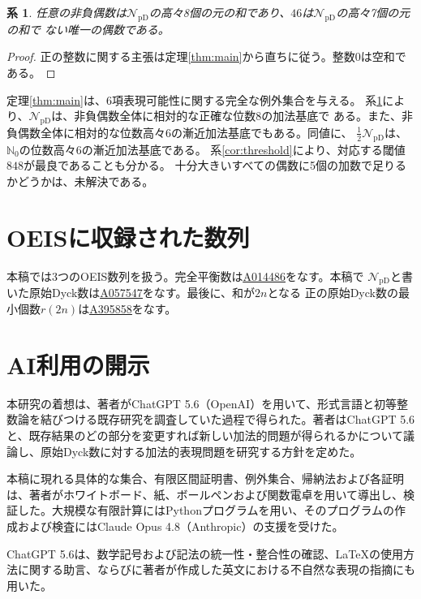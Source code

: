 \documentclass[12pt]{ltjsarticle}
\theoremstyle{plain}
\newtheorem{corollary}[theorem]{系}
\newcommand{\NpD}{\mathcal{N}_{\mathrm{pD}}}
\newcommand{\seqnum}[1]{\href{https://oeis.org/#1}{\textnormal{\underline{#1}}}}
\begin{document}
\begin{corollary}\label{cor:eight}
任意の非負偶数は$\NpD$の高々8個の元の和であり、$46$は$\NpD$の高々7個の元の和で
ない唯一の偶数である。
\end{corollary}

\begin{proof}
正の整数に関する主張は定理\ref{thm:main}から直ちに従う。整数$0$は空和である。
\end{proof}

定理\ref{thm:main}は、6項表現可能性に関する完全な例外集合を与える。
系\ref{cor:eight}により、$\NpD$は、非負偶数全体に相対的な正確な位数8の加法基底で
ある。また、非負偶数全体に相対的な位数高々6の漸近加法基底でもある。同値に、
$\frac12\NpD$は、$\mathbb N_0$の位数高々6の漸近加法基底である。
系\ref{cor:threshold}により、対応する閾値$848$が最良であることも分かる。
十分大きいすべての偶数に5個の加数で足りるかどうかは、未解決である。

\section{OEISに収録された数列}\label{sec:oeis}

本稿では3つのOEIS数列を扱う。完全平衡数は\seqnum{A014486}をなす。本稿で
$\NpD$と書いた原始Dyck数は\seqnum{A057547}をなす。最後に、和が$2n$となる
正の原始Dyck数の最小個数$r(2n)$は\seqnum{A395858}をなす。

\section{AI利用の開示}\label{sec:AI}

本研究の着想は、著者がChatGPT 5.6（OpenAI）を用いて、形式言語と初等整数論を結びつける既存研究を調査していた過程で得られた。著者はChatGPT 5.6と、既存結果のどの部分を変更すれば新しい加法的問題が得られるかについて議論し、原始Dyck数に対する加法的表現問題を研究する方針を定めた。

本稿に現れる具体的な集合、有限区間証明書、例外集合、帰納法および各証明は、著者がホワイトボード、紙、ボールペンおよび関数電卓を用いて導出し、検証した。大規模な有限計算にはPythonプログラムを用い、そのプログラムの作成および検査にはClaude Opus 4.8（Anthropic）の支援を受けた。

ChatGPT 5.6は、数学記号および記法の統一性・整合性の確認、\LaTeX{}の使用方法に関する助言、ならびに著者が作成した英文における不自然な表現の指摘にも用いた。
\end{document}
